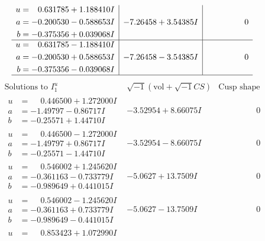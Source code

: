 \documentclass[1p]{elsarticle_modified}
\theoremstyle{definition}
\newcommand{\I}{\sqrt{-1}}
\begin{document}
$$\begin{array}{c|c|c}
\begin{aligned}
u &= \phantom{-}0.631785 + 1.188410 I \\
a &= -0.200530 - 0.588653 I \\
b &= -0.375356 + 0.039068 I\end{aligned}
 & -7.26458 + 3.54385 I & \phantom{-0.000000 } 0 \\ \hline\begin{aligned}
u &= \phantom{-}0.631785 - 1.188410 I \\
a &= -0.200530 + 0.588653 I \\
b &= -0.375356 - 0.039068 I\end{aligned}
 & -7.26458 - 3.54385 I & \phantom{-0.000000 } 0\\
 \hline 
 \end{array}$$\newpage$$\begin{array}{c|c|c}  
\text{Solutions to }I^u_{1}& \I (\text{vol} + \sqrt{-1}CS) & \text{Cusp shape}\\
 \hline 
\begin{aligned}
u &= \phantom{-}0.446500 + 1.272000 I \\
a &= -1.49797 - 0.86717 I \\
b &= -0.25571 + 1.44710 I\end{aligned}
 & -3.52954 + 8.66075 I & \phantom{-0.000000 } 0 \\ \hline\begin{aligned}
u &= \phantom{-}0.446500 - 1.272000 I \\
a &= -1.49797 + 0.86717 I \\
b &= -0.25571 - 1.44710 I\end{aligned}
 & -3.52954 - 8.66075 I & \phantom{-0.000000 } 0 \\ \hline\begin{aligned}
u &= \phantom{-}0.546002 + 1.245620 I \\
a &= -0.361163 - 0.733779 I \\
b &= -0.989649 + 0.441015 I\end{aligned}
 & -5.0627 + 13.7509 I & \phantom{-0.000000 } 0 \\ \hline\begin{aligned}
u &= \phantom{-}0.546002 - 1.245620 I \\
a &= -0.361163 + 0.733779 I \\
b &= -0.989649 - 0.441015 I\end{aligned}
 & -5.0627 - 13.7509 I & \phantom{-0.000000 } 0 \\ \hline\begin{aligned}
u &= \phantom{-}0.853423 + 1.072990 I \\

\end{aligned}
\end{array}$$
\end{document}
